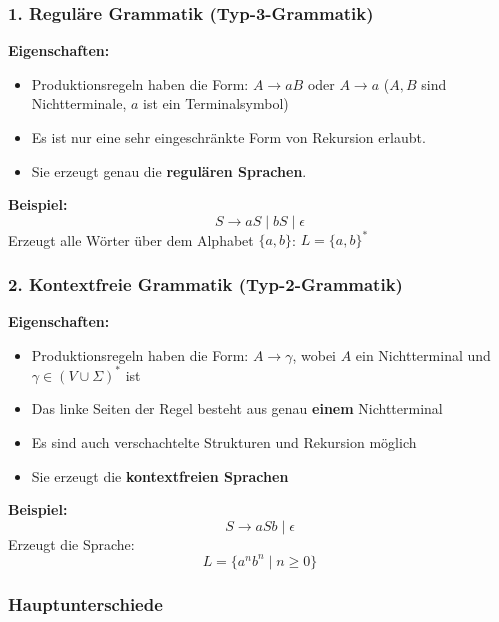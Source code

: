 \documentclass[a4paper,12pt]{article}
\begin{document}
\begin{enumerate}
			
			\subsubsection*{1. Reguläre Grammatik (Typ-3-Grammatik)}
			
			\textbf{Eigenschaften:}
			\begin{itemize}
				\item Produktionsregeln haben die Form:  
				\( A \rightarrow aB \) oder \( A \rightarrow a \)  
				(\( A, B \) sind Nichtterminale, \( a \) ist ein Terminalsymbol)
				\item Es ist nur eine sehr eingeschränkte Form von Rekursion erlaubt.
				\item Sie erzeugt genau die \textbf{regulären Sprachen}.
			\end{itemize}
			
			\textbf{Beispiel:}
			\[
			S \rightarrow aS \mid bS \mid \epsilon
			\]
			Erzeugt alle Wörter über dem Alphabet \( \{a, b\} \): \( L = \{a, b\}^* \)
			
			\vspace{1em}
			
			\subsubsection*{2. Kontextfreie Grammatik (Typ-2-Grammatik)}
			
			\textbf{Eigenschaften:}
			\begin{itemize}
				\item Produktionsregeln haben die Form:  
				\( A \rightarrow \gamma \), wobei \( A \) ein Nichtterminal und \( \gamma \in (V \cup \Sigma)^* \) ist
				\item Das linke Seiten der Regel besteht aus genau \textbf{einem} Nichtterminal
				\item Es sind auch verschachtelte Strukturen und Rekursion möglich
				\item Sie erzeugt die \textbf{kontextfreien Sprachen}
			\end{itemize}
			
			\textbf{Beispiel:}
			\[
			S \rightarrow aSb \mid \epsilon
			\]
			Erzeugt die Sprache:  
			\[
			L = \{ a^n b^n \mid n \geq 0 \}
			\]
			
			\vspace{1em}
			
			\subsubsection*{Hauptunterschiede}
			

\end{enumerate}
\end{document}
